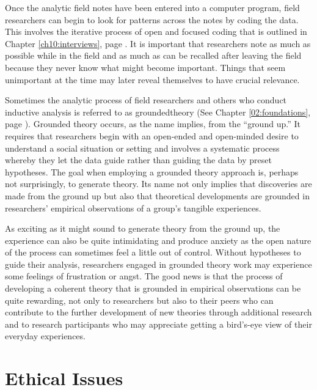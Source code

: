Once the analytic field notes have been entered into a computer program, field researchers can begin to look for patterns across the notes by coding the data. This involves the iterative process of open and focused coding that is outlined in Chapter \ref{ch10:interviews}, page \pageref{ch10:interviews}. It is important that researchers note as much as possible while in the field and as much as can be recalled after leaving the field because they never know what might become important. Things that seem unimportant at the time may later reveal themselves to have crucial relevance.

Sometimes the analytic process of field researchers and others who conduct inductive analysis is referred to as \gls{groundedtheory} (See Chapter \ref{02:foundations}, page \pageref{02:foundations}). Grounded theory occurs, as the name implies, from the ``ground up.'' It requires that researchers begin with an open-ended and open-minded desire to understand a social situation or setting and involves a systematic process whereby they let the data guide rather than guiding the data by preset hypotheses. The goal when employing a grounded theory approach is, perhaps not surprisingly, to generate theory. Its name not only implies that discoveries are made from the ground up but also that theoretical developments are grounded in researchers' empirical observations of a group's tangible experiences.

As exciting as it might sound to generate theory from the ground up, the experience can also be quite intimidating and produce anxiety as the open nature of the process can sometimes feel a little out of control. Without hypotheses to guide their analysis, researchers engaged in grounded theory work may experience some feelings of frustration or angst. The good news is that the process of developing a coherent theory that is grounded in empirical observations can be quite rewarding, not only to researchers but also to their peers who can contribute to the further development of new theories through additional research and to research participants who may appreciate getting a bird's-eye view of their everyday experiences.

\section{Ethical Issues}


